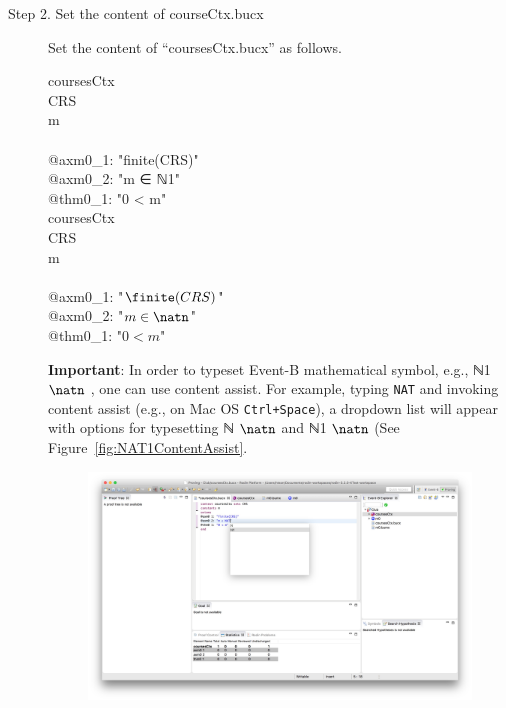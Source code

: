 \begin{description}
\item[Step 2. Set the content of courseCtx.bucx] Set the content of ``coursesCtx.bucx'' as follows.
  \begin{center}
    \begin{Bcode}
      \ifplastex
      \Bcontext{} coursesCtx\\
      \Bsets{} CRS\\
      \Bconstants{} m\\
      \Baxioms\\
      @axm0_1: "finite(CRS)"\\
      @axm0_2: "m ∈ ℕ1"\\
      @thm0_1: "0 < m" \Btheorem\\
      \Bend
      \else
\Bcontext{} coursesCtx\\
\Bsets{} CRS\\
\Bconstants{} m\\
\Baxioms\\
\Btab @axm0\_1: "\(\finite(CRS)\)"\\
\Btab @axm0\_2: "\(m \in \natn\)"\\
\Btab @thm0\_1: "\(0 < m\)" \Btheorem\\
\Bend
       \fi
    \end{Bcode}
  \end{center}
  \textbf{Important}: In order to typeset Event-B mathematical symbol, e.g., \ifplastex ℕ1 \else $\natn$ \fi, one can use content assist. For example, typing \texttt{NAT} and invoking content assist (e.g., on Mac OS \texttt{Ctrl+Space}), a dropdown list will appear with options for typesetting \ifplastex ℕ \else $\natn$ \fi and \ifplastex ℕ1 \else $\natn$ \fi (See Figure~\ref{fig:NAT1ContentAssist}.
  \begin{figure}[!htbp]
    \centering
    \ifplastex
    \includegraphics[width=512]{figures/NAT1ContentAssist}

\end{figure}
\end{description}
